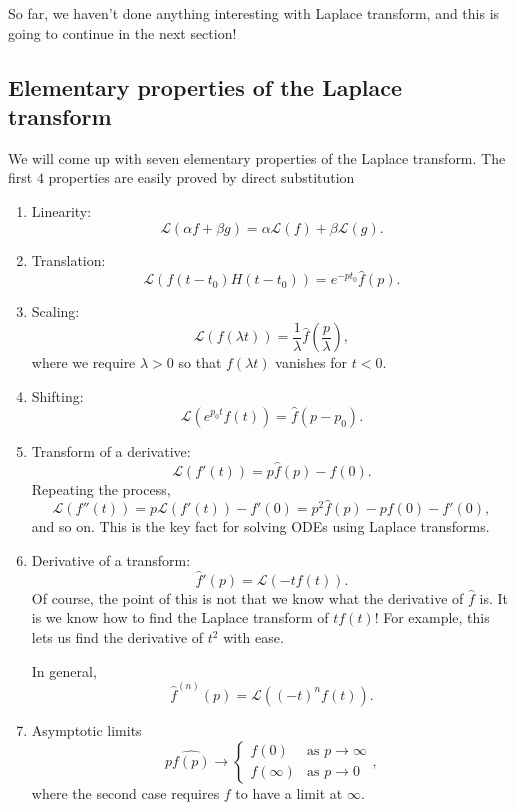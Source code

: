 \documentclass[a4paper]{article}
\begin{document}
So far, we haven't done anything interesting with Laplace transform, and this is going to continue in the next section!
\subsection{Elementary properties of the Laplace transform}
We will come up with seven elementary properties of the Laplace transform. The first $4$ properties are easily proved by direct substitution
\begin{prop}\leavevmode
  \begin{enumerate}
    \item Linearity:
      \[
        \mathcal{L}(\alpha f + \beta g) = \alpha \mathcal{L}(f) + \beta \mathcal{L}(g).
      \]
    \item Translation:
      \[
        \mathcal{L}(f(t - t_0)H(t - t_0)) = e^{-pt_0} \hat{f}(p).
      \]
    \item Scaling:
      \[
        \mathcal{L}(f(\lambda t)) = \frac{1}{\lambda} \hat{f} \left(\frac{p}{\lambda}\right),
      \]
      where we require $\lambda > 0$ so that $f(\lambda t)$ vanishes for $t < 0$.
    \item Shifting:
      \[
        \mathcal{L}(e^{p_0 t}f(t)) = \hat{f}(p - p_0).
      \]
    \item Transform of a derivative:
      \[
        \mathcal{L}(f'(t)) = p \hat{f}(p) - f(0).
      \]
      Repeating the process,
      \[
        \mathcal{L}(f''(t)) = p \mathcal{L}(f'(t)) - f'(0) = p^2 \hat{f}(p) - p f(0) - f'(0),
      \]
      and so on. This is the key fact for solving ODEs using Laplace transforms.
    \item Derivative of a transform:
      \[
        \hat{f}'(p) = \mathcal{L}(-tf(t)).
      \]
      Of course, the point of this is not that we know what the derivative of $\hat{f}$ is. It is we know how to find the Laplace transform of $tf(t)$! For example, this lets us find the derivative of $t^2$ with ease.

      In general,
      \[
        \hat{f}^{(n)} (p) = \mathcal{L}((-t)^n f(t)).
      \]
    \item Asymptotic limits
      \[
        p\hat{f(p)} \to
        \begin{cases}
          f(0) & \text{as }p \to \infty\\
          f(\infty) & \text{as }p \to 0
        \end{cases},
      \]
      where the second case requires $f$ to have a limit at $\infty$.
  \end{enumerate}
\end{prop}
\end{document}
